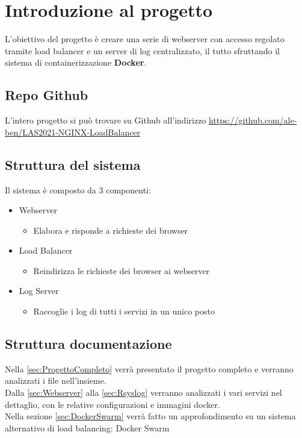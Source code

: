 \documentclass[../DocumentazioneProgetto.tex]{subfiles}
\begin{document}
	\section{Introduzione al progetto}
	L'obiettivo del progetto è creare una serie di webserver con accesso regolato tramite load balancer e un server di log centralizzato, il tutto sfruttando il sistema di containerizzazione \textbf{Docker}.
	\subsection{Repo Github} 
	L'intero progetto si può trovare su Github all'indirizzo \href{https://github.com/ale-ben/LAS2021-NGINX-LoadBalancer}{https://github.com/ale-ben/LAS2021-NGINX-LoadBalancer}
	\subsection{Struttura del sistema} 
	\label{sec:IntroduzioneStrutturaSistema}
	Il sistema è composto da 3 componenti:
	\begin{itemize}
		\item Webserver
		\begin{itemize}
			\item Elabora e risponde a richieste dei browser
		\end{itemize}
		\item Load Balancer
		\begin{itemize}
			\item Reindirizza le richieste dei browser ai webserver
		\end{itemize}
		\item Log Server
		\begin{itemize}
			\item Raccoglie i log di tutti i servizi in un unico posto
		\end{itemize}
	\end{itemize}
	\subsection{Struttura documentazione}
	Nella \autoref{sec:ProgettoCompleto} verrà presentato il progetto completo e verranno analizzati i file nell'insieme.\\
	Dalla  \autoref{sec:Webserver} alla \autoref{sec:Rsyslog} verranno analizzati i vari servizi nel dettaglio, con le relative configurazioni e immagini docker.\\
	Nella sezione \autoref{sec:DockerSwarm} verrà fatto un approfondimento su un sistema alternativo di load balancing: Docker Swarm
\end{document}
